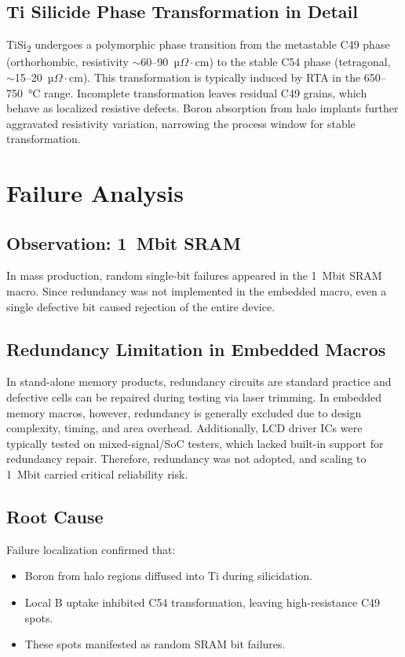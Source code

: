 \documentclass[conference]{IEEEtran}
\begin{document}
\subsection{Ti Silicide Phase Transformation in Detail}
TiSi\textsubscript{2} undergoes a polymorphic phase transition from
the metastable C49 phase (orthorhombic, resistivity $\sim$60--90~µ$\Omega\cdot$cm)
to the stable C54 phase (tetragonal, $\sim$15--20~µ$\Omega\cdot$cm).
This transformation is typically induced by RTA in the 650--750~°C range.
Incomplete transformation leaves residual C49 grains, which behave as
localized resistive defects.
Boron absorption from halo implants further aggravated resistivity variation,
narrowing the process window for stable transformation.

\section{Failure Analysis}
\subsection{Observation: 1~Mbit SRAM}
In mass production, random single-bit failures appeared in the 1~Mbit SRAM macro. Since redundancy was not implemented in the embedded macro, even a single defective bit caused rejection of the entire device.

\subsection{Redundancy Limitation in Embedded Macros}
In stand-alone memory products, redundancy circuits are standard practice and defective cells can be repaired during testing via laser trimming.
In embedded memory macros, however, redundancy is generally excluded due to design complexity, timing, and area overhead.
Additionally, LCD driver ICs were typically tested on mixed-signal/SoC testers, which lacked built-in support for redundancy repair.
Therefore, redundancy was not adopted, and scaling to 1~Mbit carried critical reliability risk.

\subsection{Root Cause}
Failure localization confirmed that:
\begin{itemize}
    \item Boron from halo regions diffused into Ti during silicidation.
    \item Local B uptake inhibited C54 transformation, leaving high-resistance C49 spots.
    \item These spots manifested as random SRAM bit failures.
\end{itemize}
\end{document}
